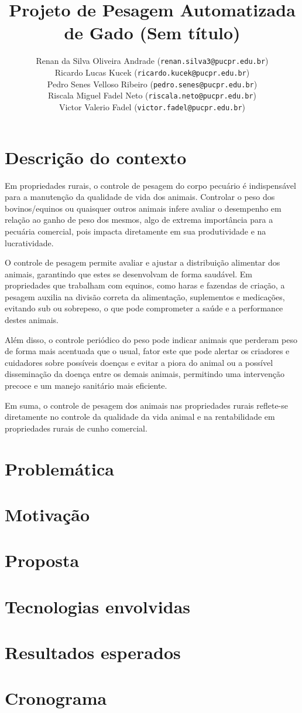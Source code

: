 \documentclass[11pt]{article}
\title{\textbf{Projeto de Pesagem Automatizada de Gado (Sem título)}}
\author{
    Renan da Silva Oliveira Andrade (\texttt{renan.silva3@pucpr.edu.br})\\
    Ricardo Lucas Kucek (\texttt{ricardo.kucek@pucpr.edu.br})\\
    Pedro Senes Velloso Ribeiro (\texttt{pedro.senes@pucpr.edu.br})\\ 
    Riscala Miguel Fadel Neto (\texttt{riscala.neto@pucpr.edu.br})\\ Victor Valerio Fadel (\texttt{victor.fadel@pucpr.edu.br})
}
\begin{document}
\maketitle

\section{Descrição do contexto}

Em propriedades rurais, o controle de pesagem do corpo pecuário é indispensável para a manutenção da qualidade de vida dos animais. Controlar o peso dos bovinos/equinos ou quaisquer outros animais infere avaliar o desempenho em relação ao ganho de peso dos mesmos, algo de extrema importância para a pecuária comercial, pois impacta diretamente em sua produtividade e na lucratividade.

O controle de pesagem permite avaliar e ajustar a distribuição alimentar dos animais, garantindo que estes se desenvolvam de forma saudável. Em propriedades que trabalham com equinos, como haras e fazendas de criação, a pesagem auxilia na divisão correta da alimentação, suplementos e medicações, evitando sub ou sobrepeso, o que pode comprometer a saúde e a performance destes animais.

Além disso, o controle periódico do peso pode indicar animais que perderam peso de forma mais acentuada que o usual, fator este que pode alertar os criadores e cuidadores sobre possíveis doenças e evitar a piora do animal ou a possível disseminação da doença entre os demais animais, permitindo uma intervenção precoce e um manejo sanitário mais eficiente.

Em suma, o controle de pesagem dos animais nas propriedades rurais reflete-se diretamente no controle da qualidade da vida animal e na rentabilidade em propriedades rurais de cunho comercial.

\section{Problemática}
\section{Motivação}
\section{Proposta}
\section{Tecnologias envolvidas}
\section{Resultados esperados}
\section{Cronograma}



\end{document}
